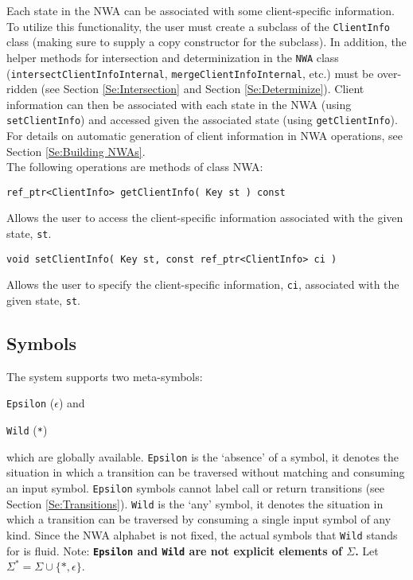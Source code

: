 Each state in the NWA can be associated with some client-specific
information. To utilize this functionality, the user must create a subclass
of the \texttt{ClientInfo} class (making sure to supply a copy constructor
for the subclass).  In addition, the helper methods for intersection and
determinization in the \texttt{NWA} class
(\texttt{intersectClientInfoInternal}, \texttt{mergeClientInfoInternal},
etc.) must be over-ridden (see Section \ref{Se:Intersection} and Section
\ref{Se:Determinize}).  Client information can then be associated with each
state in the NWA (using \texttt{setClientInfo}) and accessed given the
associated state (using \texttt{getClientInfo}).  For details on automatic
generation of client information in NWA operations, see Section
\ref{Se:Building NWAs}. \\

\noindent The following operations are methods of class NWA:

\begin{description}

  \item\texttt{ref\_ptr<ClientInfo> getClientInfo( Key st ) const} \nopagebreak

    Allows the user to access the client-specific information associated with
    the given state, \texttt{st}.

  \item\texttt{void setClientInfo( Key st, const ref\_ptr<ClientInfo> ci )} \nopagebreak

    Allows the user to specify the client-specific information, \texttt{ci},
    associated with the given state, \texttt{st}. \\

\end{description}

\subsection{Symbols}
\label{Se:Symbols}

The system supports two meta-symbols: \begin{inparaenum} \item
  \texttt{Epsilon} (\texttt{$\epsilon$}) and \item \texttt{Wild}
  (\texttt{*}) \end{inparaenum} which are globally available.
\texttt{Epsilon} is the `absence' of a symbol, it denotes the situation in
which a transition can be traversed without matching and consuming an input
symbol.  \texttt{Epsilon} symbols cannot label call or return transitions
(see Section \ref{Se:Transitions}).  \texttt{Wild} is the `any' symbol, it
denotes the situation in which a transition can be traversed by consuming a
single input symbol of any kind.  Since the NWA alphabet is not fixed, the
actual symbols that \texttt{Wild} stands for is fluid.  Note:
\textbf{\texttt{Epsilon} and \texttt{Wild} are not explicit elements of $\Sigma$.} Let
$\Sigma^* = \Sigma \cup \{*, \epsilon\}$.\\

